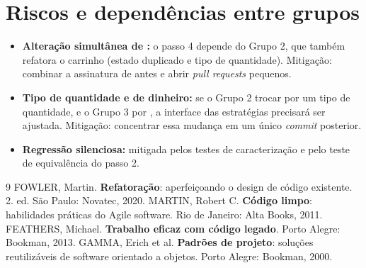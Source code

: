 \section{Riscos e depend\^encias entre grupos}
\begin{itemize}
\item \textbf{Altera\c{c}\~ao simult\^anea de :} o passo 4 depende do Grupo 2, que tamb\'em refatora o carrinho (estado duplicado e tipo de quantidade). Mitiga\c{c}\~ao: combinar a assinatura de  antes e abrir \textit{pull requests} pequenos.
\item \textbf{Tipo de quantidade e de dinheiro:} se o Grupo 2 trocar  por um tipo de quantidade, e o Grupo 3 por , a interface das estrat\'egias precisar\'a ser ajustada. Mitiga\c{c}\~ao: concentrar essa mudan\c{c}a em um \'unico \textit{commit} posterior.
\item \textbf{Regress\~ao silenciosa:} mitigada pelos testes de caracteriza\c{c}\~ao e pelo teste de equival\^encia do passo 2.
\end{itemize}

\begin{thebibliography}{9}\small
{} FOWLER, Martin. \textbf{Refatora\c{c}\~ao}: aperfei\c{c}oando o design de c\'odigo existente. 2. ed. S\~ao Paulo: Novatec, 2020.
 MARTIN, Robert C. \textbf{C\'odigo limpo}: habilidades pr\'aticas do Agile software. Rio de Janeiro: Alta Books, 2011.
 FEATHERS, Michael. \textbf{Trabalho eficaz com c\'odigo legado}. Porto Alegre: Bookman, 2013.
 GAMMA, Erich et al. \textbf{Padr\~oes de projeto}: solu\c{c}\~oes reutiliz\'aveis de software orientado a objetos. Porto Alegre: Bookman, 2000.
\end{thebibliography}

